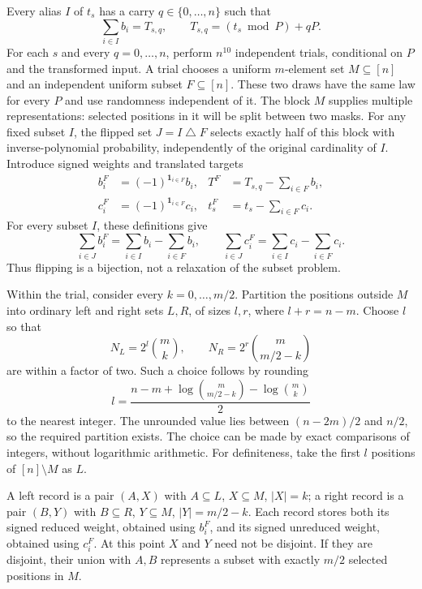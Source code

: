 Every alias $I$ of $t_s$ has a carry $q\in\{0,\ldots,n\}$ such that
\begin{equation}
 \sum_{i\in I}b_i=T_{s,q},
 \qquad T_{s,q}=(t_s\bmod P)+qP.
 \label{eq:alias-carry}
\end{equation}
For each $s$ and every $q=0,\ldots,n$, perform $n^{10}$ independent trials,
conditional on $P$ and the transformed input.  A trial chooses a uniform
$m$-element set $M\subseteq[n]$ and an independent uniform subset
$F\subseteq[n]$.  These two draws have the same law for every $P$ and
use randomness independent of it.
The block $M$ supplies multiple representations: selected positions in
it will be split between two masks.  For any fixed subset $I$, the flipped
set $J=I\mathbin\triangle F$ selects exactly half of this block with
inverse-polynomial probability, independently of the original cardinality
of $I$.
Introduce signed weights and translated targets
\begin{equation}
 \begin{aligned}
  b_i^F&=(-1)^{\mathbf1_{i\in F}}b_i,
  &T^F&=T_{s,q}-\sum_{i\in F}b_i,\\
  c_i^F&=(-1)^{\mathbf1_{i\in F}}c_i,
  &t_s^F&=t_s-\sum_{i\in F}c_i.
 \end{aligned}
 \label{eq:alias-flip}
\end{equation}
For every subset $I$, these definitions give
\[
 \sum_{i\in J}b_i^F=\sum_{i\in I}b_i-\sum_{i\in F}b_i,
 \qquad
 \sum_{i\in J}c_i^F=\sum_{i\in I}c_i-\sum_{i\in F}c_i.
\]
Thus flipping is a bijection, not a relaxation of the subset problem.

Within the trial, consider every $k=0,\ldots,m/2$.  Partition the positions
outside $M$ into ordinary left and right sets $L,R$, of sizes $l,r$,
where $l+r=n-m$.  Choose $l$ so that
\begin{equation}
 N_L=2^l\binom mk,
 \qquad N_R=2^r\binom m{m/2-k}
 \label{eq:alias-raw-sizes}
\end{equation}
are within a factor of two.  Such a choice follows by rounding
\[
 l=\frac{n-m+\log\binom m{m/2-k}-\log\binom mk}{2}
\]
to the nearest integer.  The unrounded value lies between
$(n-2m)/2$ and $n/2$, so the required partition exists.  The choice can
be made by exact comparisons of integers, without logarithmic arithmetic.
For definiteness, take the first $l$ positions of $[n]\setminus M$ as $L$.

A left record is a pair $(A,X)$ with $A\subseteq L$, $X\subseteq M$,
$|X|=k$; a right record is a pair $(B,Y)$ with $B\subseteq R$,
$Y\subseteq M$, $|Y|=m/2-k$.  Each record stores both its signed reduced
weight, obtained using $b_i^F$, and its signed unreduced weight, obtained
using $c_i^F$.  At this point $X$ and $Y$ need not be disjoint.
If they are disjoint, their union with $A,B$ represents a subset with
exactly $m/2$ selected positions in $M$.

